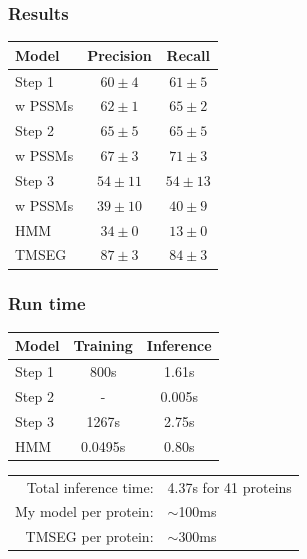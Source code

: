 \documentclass{beamer}
\begin{document}
\begin{frame}
\frametitle{Results}
\centering 
\begin{tabular}{l|c|c} 
	Model & Precision & Recall \\ \hline
	Step 1 & $60 \pm 4$ & $61 \pm 5$ \\
	w PSSMs& $62 \pm 1$ & $65 \pm 2$ \\
	Step 2 & $65 \pm 5$ & $65 \pm 5$ \\
	w PSSMs& $67 \pm 3$ & $71 \pm 3$ \\
	Step 3 & $54 \pm 11$ & $54 \pm 13$ \\
	w PSSMs& $39 \pm 10$ & $40 \pm 9$ \\
	HMM   & $34 \pm 0$ & $13 \pm 0$ \\ 
	TMSEG & $87 \pm 3$ & $84 \pm 3$
\end{tabular}
\end{frame}

\begin{frame}
\frametitle{Run time}
\centering
\begin{tabular}{l|c|c} 
	Model & Training & Inference \\ \hline
	Step 1 & 800s & 1.61s \\ 
	Step 2 & - & 0.005s \\ 
	Step 3 & 1267s & 2.75s \\
	HMM   & 0.0495s & 0.80s
\end{tabular}

\begin{tabular}{rl}
Total inference time:& 4.37s for 41 proteins \\
My model per protein:& $\sim$100ms \\
TMSEG per protein:& $\sim$300ms
\end{tabular}
\end{frame}

\end{document}
